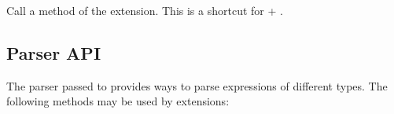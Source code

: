 \documentclass[a4paper,10pt,english]{sphinxmanual}
\begin{document}
\begin{fulllineitems}

\begin{fulllineitems}
\label{extensions:jinja2.ext.Extension.call_method}
Call a method of the extension.  This is a shortcut for
{\hyperref[templates:attr]{}} + {\hyperref[extensions:jinja2.nodes.Call]{}}.

\end{fulllineitems}


\end{fulllineitems}



\subsection{Parser API}
\label{extensions:parser-api}
The parser passed to {\hyperref[extensions:jinja2.ext.Extension.parse]{}} provides ways to parse
expressions of different types.  The following methods may be used by
extensions:
\end{document}
